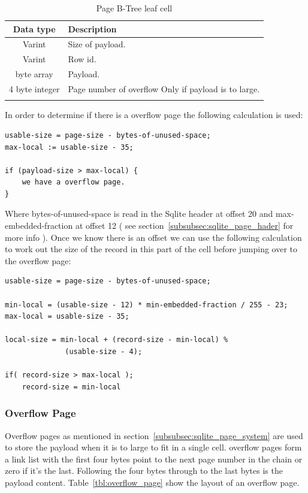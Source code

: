 \begin{longtable}[h]{| c | p{5cm} |}
		\hline
			\textbf{Data type} & \textbf{Description} \\ 
		\hline
		\endhead
			Varint & Size of payload. \\
		\hline
			Varint & Row id. \\
		\hline
			byte array & Payload. \\
		\hline
			4 byte integer & Page number of overflow \newline
							  Only if payload is to large.\\
		\hline
	\caption{Page B-Tree leaf cell}
	\label{tbl:table_btree_cell_leaf}
\end{longtable}

In order to determine if there is a overflow page the following calculation is used:

\begin{lstlisting}	
usable-size = page-size - bytes-of-unused-space;
max-local := usable-size - 35;

if (payload-size > max-local) {
	we have a overflow page.
}
\end{lstlisting}

Where bytes-of-unused-space is read in the Sqlite header at offset 20 and \newline max-embedded-fraction at offset 12 ( see section~\ref{subsubsec:sqlite_page_hader} for more info ). Once we know there is an offset we can use the following calculation to work out the size of the record in this part of the cell before jumping over to the overflow page:  

\begin{lstlisting}	
usable-size = page-size - bytes-of-unused-space;

min-local = (usable-size - 12) * min-embedded-fraction / 255 - 23;
max-local = usable-size - 35;

local-size = min-local + (record-size - min-local) %
			  (usable-size - 4);

if( record-size > max-local );
	record-size = min-local
\end{lstlisting}


\subsubsection{Overflow Page}
\label{subsubsec:overflow_page}

Overflow pages as mentioned in section~\ref{subsubsec:sqlite_page_system} are used to store the payload when it is to large to fit in a single cell. overflow pages form a link list with the first four bytes point to the next page number in the chain or zero if it's the last. Following the four bytes through to the last bytes is the payload content. Table~\ref{tbl:overflow_page} show the layout of an overflow page.

